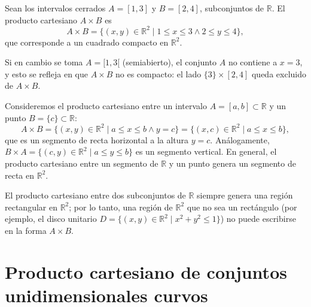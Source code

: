 \begin{ejemplo}
Sean los intervalos cerrados $A = [1,3]$ y $B = [2,4]$, subconjuntos de
$\mathbb{R}$. El producto cartesiano $A \times B$ es
\[
A \times B = \{ (x,y) \in \mathbb{R}^2 \mid 1 \le x \le 3 \wedge 2 \le y \le 4 \},
\]
que corresponde a un cuadrado compacto en $\mathbb{R}^2$.

\begin{center}
\end{center}

Si en cambio se toma $A=[1,3[$ (semiabierto), el conjunto $A$ no contiene a
$x=3$, y esto se refleja en que $A \times B$ no es compacto: el lado
$\{3\} \times [2,4]$ queda excluido de $A \times B$.
\end{ejemplo}

\begin{ejemplo}
Consideremos el producto cartesiano entre un intervalo $A = [a,b] \subset
\mathbb{R}$ y un punto $B = \{c\} \subset \mathbb{R}$:
\[
A \times B = \{(x,y)\in\mathbb{R}^2 \mid a \le x \le b \wedge y = c\}
= \{(x,c)\in \mathbb{R}^2 \mid a\le x\le b\},
\]
que es un segmento de recta horizontal a la altura $y=c$. Análogamente,
$B\times A = \{(c,y)\in\mathbb{R}^2 \mid a\le y \le b\}$ es un segmento
vertical. En general, el producto cartesiano entre un segmento de
$\mathbb{R}$ y un punto genera un segmento de recta en $\mathbb{R}^2$.
\end{ejemplo}

\begin{observacion}
El producto cartesiano entre dos subconjuntos de $\mathbb{R}$ siempre genera
una región rectangular en $\mathbb{R}^2$; por lo tanto, una región de
$\mathbb{R}^2$ que no sea un rectángulo (por ejemplo, el disco unitario
$D = \{(x,y)\in\mathbb{R}^2 \mid x^2+y^2 \le 1\}$) no puede escribirse en la
forma $A \times B$.
\end{observacion}

\section{Producto cartesiano de conjuntos unidimensionales curvos}

